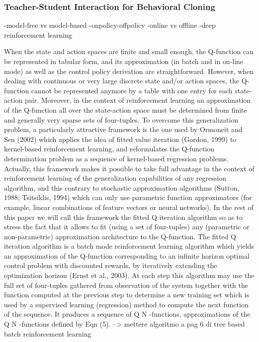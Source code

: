 \subsubsection{Teacher-Student Interaction for Behavioral Cloning}
\label{teacher-student}

\cite{il}



-model-free vs model-based
-onpolicy-offpolicy
-online vs offline
-deep reinforcement learning





	When the state and action spaces are finite and small enough, the Q-function can be represented in tabular form, and its approximation (in batch and in on-line mode) as well as the control policy derivation are straightforward. However, when dealing with continuous or very large discrete state and/or action spaces, the Q-function cannot be represented anymore by a table with one entry for each state-action pair. Moreover, in the context of reinforcement learning an approximation of the Q-function all over the state-action space must be determined from finite and generally very sparse sets of four-tuples.
To overcome this generalization problem, a particularly attractive framework is the one used by Ormoneit and Sen (2002) which applies the idea of fitted value iteration (Gordon, 1999) to kernel-based reinforcement learning, and reformulates the Q-function determination problem as a sequence of kernel-based regression problems. Actually, this framework makes it possible to take full advantage in the context of reinforcement learning of the generalization capabilities of any regression algorithm, and this contrary to stochastic approximation algorithms (Sutton, 1988; Tsitsiklis, 1994) which can only use parametric function approximators (for example, linear combinations of feature vectors or neural networks). In the rest of this paper we will call this framework the fitted Q iteration
algorithm so as to stress the fact that it allows to fit (using a set of four-tuples) any (parametric or non-parametric) approximation architecture to the Q-function.
The fitted Q iteration algorithm is a batch mode reinforcement learning algorithm which yields an approximation of the Q-function corresponding to an infinite horizon optimal control problem with discounted rewards, by iteratively extending the optimization horizon (Ernst et al., 2003).
At each step this algorithm may use the full set of four-tuples gathered from observation of the system together with the function computed at the previous step to determine a new training set which is used by a supervised learning (regression) method to compute the next function of the sequence. It produces a sequence of Q N -functions, approximations of the Q N -functions defined by Eqn (5). --> mettere algoritmo a pag 6 di tree based batch reinforcement learning

